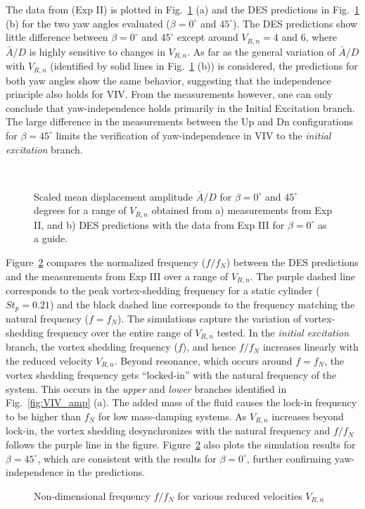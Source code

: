 The data from \citet{franzini2013one} (Exp II) is plotted in
Fig.~\ref{fig:VIV_yaw} (a) and the DES predictions in Fig.~\ref{fig:VIV_yaw}
(b) for the two yaw angles evaluated ($\beta=0^\circ$ and $45^\circ$). The DES
predictions show little difference between $\beta=0^\circ$ and $45^\circ$
except around $V_{R,n}=4$ and $6$, where $\bar{A}/D$ is highly sensitive to
changes in $V_{R,n}$. As far as the general variation of $\bar{A}/D$ with
$V_{R,n}$ (identified by solid lines in Fig.~\ref{fig:VIV_yaw} (b)) is
considered, the predictions for both yaw angles show the same behavior,
suggesting that the independence principle also holds for VIV. From the
measurements however, one can only conclude that yaw-independence holds
primarily in the Initial Excitation branch. The large difference in the
measurements between the Up and Dn configurations for $\beta=45^\circ$ limits
the verification of yaw-independence in VIV to the {\em initial excitation}
branch.
%
\begin{figure}[htb!]
  \qquad
     {} \\
  \caption{Scaled mean displacement amplitude $\bar{A}/D$ for $\beta=0^\circ$
    and $45^\circ$ degrees for a range of $V_{R,n}$ obtained from a) measurements
    from Exp II, and b) DES predictions with the data from Exp III for
    $\beta=0^\circ$ as a guide.}
  \label{fig:VIV_yaw}
\end{figure}

Figure~\ref{fig:VIV_freq} compares the normalized frequency ($f/f_N$) between
the DES predictions and the measurements from Exp III over a range of
$V_{R,n}$. The purple dashed line corresponds to the peak vortex-shedding
frequency for a static cylinder ($St_p=0.21$) and the black dashed line
corresponds to the frequency matching the natural frequency ($f=f_N$). The
simulations capture the variation of vortex-shedding frequency over the entire
range of $V_{R,n}$ tested. In the {\em initial excitation} branch, the vortex
shedding frequency ($f$), and hence $f/f_N$ increases linearly with the reduced
velocity $V_{R,n}$. Beyond resonance, which occurs around $f=f_N$, the vortex
shedding frequency gets ``locked-in'' with the natural frequency of the system.
This occurs in the {\em upper} and {\em lower} branches identified in
Fig.~\ref{fig:VIV_amp} (a).  The added mass of the fluid causes the lock-in
frequency to be higher than $f_N$ for low mass-damping systems. As $V_{R,n}$
increases beyond lock-in, the vortex shedding desynchronizes with the natural
frequency and $f/f_N$ follows the purple line in the figure.
Figure~\ref{fig:VIV_freq} also plots the simulation results for
$\beta=45^\circ$, which are consistent with the results for $\beta=0^\circ$,
further confirming yaw-independence in the predictions.
%
\begin{figure}[htb!]
  \caption{Non-dimensional frequency $f/f_N$ for various reduced velocities
    $V_{R,n}$}
  \label{fig:VIV_freq}
\end{figure}

